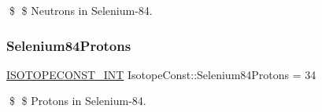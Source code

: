 \$ \$ Neutrons in Selenium-\/84. \mbox{\label{group___isotope_const-_selenium-_se84_gab68c1cc8016755fdb5bdc5b07dace4f9}} 
\subsubsection{\texorpdfstring{Selenium84\+Protons}{Selenium84Protons}}
{\footnotesize\ttfamily \mbox{\hyperlink{group___isotope_const-_macros_ga5f18360b3e99483a35c32d789e62621c}{I\+S\+O\+T\+O\+P\+E\+C\+O\+N\+S\+T\+\_\+\+I\+NT}} Isotope\+Const\+::\+Selenium84\+Protons = 34}

\$ \$ Protons in Selenium-\/84. 